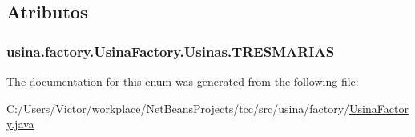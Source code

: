 \subsection{Atributos}
\hypertarget{enumusina_1_1factory_1_1_usina_factory_1_1_usinas_a6e0e481f54f6ea96a004192167bf6560}{
\subsubsection[{T\-R\-E\-S\-M\-A\-R\-I\-A\-S}]{\setlength{\rightskip}{0pt plus 5cm}usina.\-factory.\-Usina\-Factory.\-Usinas.\-T\-R\-E\-S\-M\-A\-R\-I\-A\-S}}\label{enumusina_1_1factory_1_1_usina_factory_1_1_usinas_a6e0e481f54f6ea96a004192167bf6560}


The documentation for this enum was generated from the following file\-:\begin{DoxyCompactItemize}
\item 
C\-:/\-Users/\-Victor/workplace/\-Net\-Beans\-Projects/tcc/src/usina/factory/\hyperlink{_usina_factory_8java}{Usina\-Factory.\-java}\end{DoxyCompactItemize}
